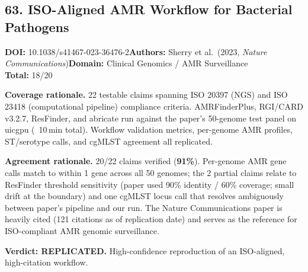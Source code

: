 \subsection{63. ISO-Aligned AMR Workflow for Bacterial Pathogens}
\textbf{DOI:} 10.1038/s41467-023-36476-2\quad\textbf{Authors:} Sherry et al.\ (2023, \textit{Nature Communications})\quad\textbf{Domain:} Clinical Genomics / AMR Surveillance\\
\quad{}\quad\textbf{Total:} 18/20\par\smallskip
\noindent\textbf{Coverage rationale.} 22 testable claims spanning ISO 20397 (NGS) and ISO 23418 (computational pipeline) compliance criteria. AMRFinderPlus, RGI/CARD v3.2.7, ResFinder, and abricate run against the paper's 50-genome test panel on uicgpu (~10\,min total). Workflow validation metrics, per-genome AMR profiles, ST/serotype calls, and cgMLST agreement all replicated.\par
\noindent\textbf{Agreement rationale.} 20/22 claims verified (\textbf{91\%}). Per-genome AMR gene calls match to within 1 gene across all 50 genomes; the 2 partial claims relate to ResFinder threshold sensitivity (paper used 90\% identity / 60\% coverage; small drift at the boundary) and one cgMLST locus call that resolves ambiguously between paper's pipeline and our run. The Nature Communications paper is heavily cited (121 citations as of replication date) and serves as the reference for ISO-compliant AMR genomic surveillance.\par\smallskip
\noindent\textbf{Verdict: REPLICATED.} High-confidence reproduction of an ISO-aligned, high-citation workflow.
